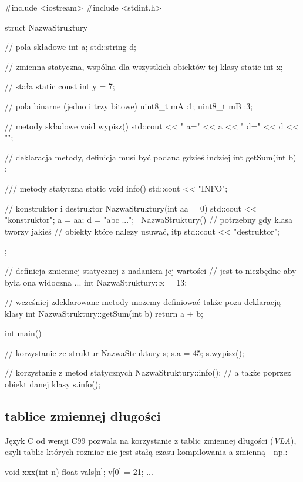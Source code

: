 \documentclass{pdfBooklets}
\begin{document}
\begin{CodeFrame*}[cpp]{}
#include <iostream>
#include <stdint.h>

struct NazwaStruktury {
    // pola składowe
    int a;
    std::string d;
    
    // zmienna statyczna, wspólna dla wszystkich obiektów tej klasy
    static int x;
    
    // stała
    static const int y = 7;
    
    // pola binarne (jedno i trzy bitowe)
    uint8_t mA :1;
    uint8_t mB :3;
    
    // metody składowe
    void wypisz() {
        std::cout << " a=" << a << " d=" << d << "\n";
    }
    
    // deklaracja metody, definicja musi być podana gdzieś indziej
    int getSum(int b) ;
    
    /// metody statyczna
    static void info() {
        std::cout << "INFO\n";
    }
    
    // konstruktor i destruktor
    NazwaStruktury(int aa = 0) {
        std::cout << "konstruktor\n";
        a = aa;
        d = "abc ...";
    }
    ~NazwaStruktury() {
        // potrzebny gdy klasa tworzy jakieś
        // obiekty które nalezy usuwać, itp
        std::cout << "destruktor\n";
    }
};

// definicja zmiennej statycznej z nadaniem jej wartości
// jest to niezbędne aby była ona widoczna ...
int NazwaStruktury::x = 13;

// wcześniej zdeklarowane metody możemy definiować także poza deklaracją klasy
int NazwaStruktury::getSum(int b) {
    return a + b;
}

int main() {
    // korzystanie ze struktur
    NazwaStruktury s;
    s.a = 45;
    s.wypisz();

    // korzystanie z metod statycznych
    NazwaStruktury::info();
    // a także poprzez obiekt danej klasy
    s.info();
}
\end{CodeFrame*}

\subsection{tablice zmiennej długości}

Język C od wersji C99 pozwala na korzystanie z tablic zmiennej długości (\textit{VLA}), czyli tablic których rozmiar nie jest stałą czasu kompilowania a zmienną - np.:

\begin{CodeFrame*}[c]{}
void xxx(int n) {
    float vals[n];
    v[0] = 21;
    ...
}
\end{CodeFrame*}
\end{document}

